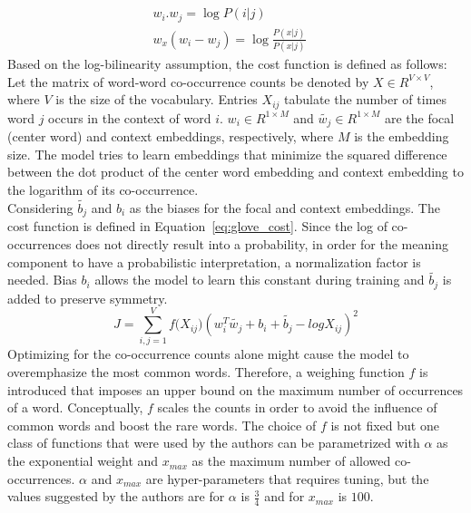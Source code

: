 \begin{equation}
\begin{split}
\\ w_{ i }.w_{ j }=\log { P(i|j)\quad  } \\ w_{ x }(w_{ i }-w_{ j })=\log { \frac { P(x|j) }{ P(x|j) } \quad  } 
\end{split}
\label{eq:log_prob}
\end{equation}
Based on the log-bilinearity assumption, the cost function is defined as follows:\\
Let the matrix of word-word co-occurrence counts be denoted by $X\in { R }^{ V\times V }$, where $V$ is the size of the vocabulary. Entries $X_{ij}$ tabulate the number of times word $j$ occurs in the context of word $i$. $w_{ i }\in { R }^{ 1\times M }$ and $\tilde{w_{ j }}\in { R }^{ 1\times M }$ are the focal (center word) and context embeddings, respectively, where $M$ is the embedding size. The model tries to learn embeddings that minimize the squared difference between the dot product of the center word embedding and context embedding to the logarithm of its co-occurrence.  \\
Considering $ \tilde{b_{ j }}$ and $b_{ i }$  as the biases for the focal and context embeddings. The cost function is defined in Equation~\ref{eq:glove_cost}.  Since the log of co-occurrences does not directly result into a probability, in order for the meaning component to have a probabilistic interpretation, a normalization factor is needed. Bias $b_{ i }$ allows the model to learn this constant during training and $ \tilde{b_{ j }}$ is added to preserve symmetry. 
\begin{equation}
J=\sum _{ i,j=1 }^{ V }{ f({ X }_{ ij } } )(w_{ i }^{ T }\tilde{  w_{ j } } +b_{ i }+\tilde{  b_{ j } } -log{ X }_{ ij })^2
\label{eq:glove_cost}
\end{equation}
Optimizing for the co-occurrence counts alone might cause the model to overemphasize the most common words. Therefore, a weighing function $f$ is introduced that imposes an upper bound on the maximum number of occurrences of a word. Conceptually,  $f$ scales the counts in order to avoid the influence of common words and boost the rare words. The choice of $f$ is not fixed but one class of functions that were used by the authors can be parametrized with $\alpha$ as the exponential weight and $x_{max}$ as the maximum number of allowed co-occurrences. $\alpha$ and $x_{max}$ are hyper-parameters that requires tuning, but the values suggested by the authors are for $\alpha$ is $\frac{3}{4}$ and for $x_{max}$ is $100$. 
